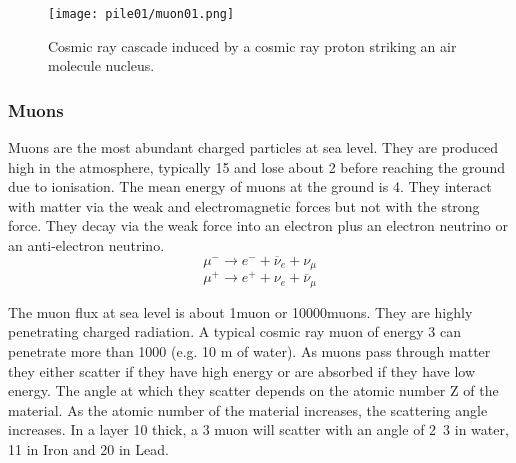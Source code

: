 \documentclass[twoside,titlepage,11pt,twocolumn,a4paper]{article}
\begin{document}
\begin{figure}
  \texttt{[image: pile01/muon01.png]}
  \caption{Cosmic ray cascade induced by a cosmic ray proton striking
    an air molecule nucleus. \citep{muonManual2005}}
\end{figure}

\subsubsection{Muons}
Muons are the most abundant charged particles at sea level. They are
produced high in the atmosphere, typically \unit{15}{\kilo\metre} and
lose about \unit{2}{\giga\electronvolt} before reaching the ground due
to ionisation. The mean energy of muons at the ground is
\unit{4}{\giga\electronvolt}. \citep{PDG2011} They interact with
matter via the weak and electromagnetic forces but not with the strong
force. They decay via the weak force into an electron plus an electron
neutrino or an anti-electron neutrino.
\[ \mu^- \rightarrow e^- + \overline{\nu}_e + \nu_\mu \]
\[ \mu^+ \rightarrow e^+ + \nu_e + \overline{\nu}_\mu \]

The muon flux at sea level is about
\unit{1}{muon\usk\rpsquare{\centi\metre}\usk\reciprocal\minute}
\citep{statisticalRec2007} or
\unit{10000}{muons\usk\rpsquare\metre\usk\reciprocal\minute}. They are
highly penetrating charged radiation.  A typical cosmic ray muon of
energy \unit{3}{\giga\electronvolt} can penetrate more than
\unit{1000}{\gram\usk\rpsquare{\centi\metre}} (e.g. 10 m of water). As
muons pass through matter they either scatter if they have high energy
or are absorbed if they have low energy. The angle at which they
scatter depends on the atomic number Z of the
material. As the atomic number of the material increases, the
scattering angle increases. In a layer \unit{10}{\centi\metre} thick,
a \unit{3}{\giga\electronvolt} muon will scatter with an angle of
\unit{2.3}{\milli\radian} in water, \unit{11}{\milli\radian} in Iron
and \unit{20}{\milli\radian} in Lead. \citep{Borozdin2003}
\end{document}
